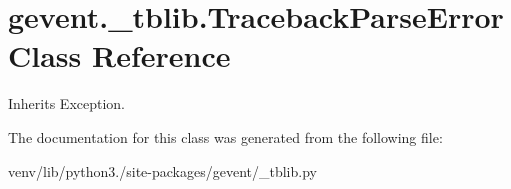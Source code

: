 \hypertarget{classgevent_1_1__tblib_1_1_traceback_parse_error}{}\section{gevent.\+\_\+tblib.\+Traceback\+Parse\+Error Class Reference}
\label{classgevent_1_1__tblib_1_1_traceback_parse_error}


Inherits Exception.



The documentation for this class was generated from the following file\+:\begin{DoxyCompactItemize}
\item 
venv/lib/python3./site-\/packages/gevent/\+\_\+tblib.\+py\end{DoxyCompactItemize}

